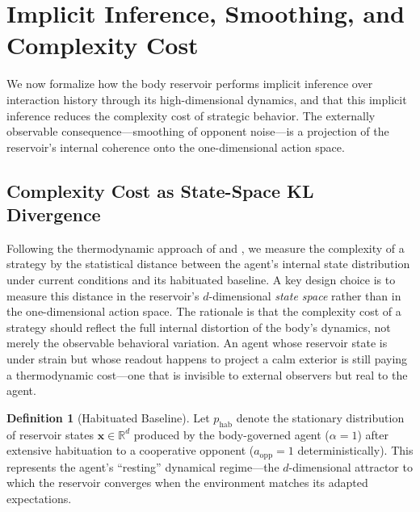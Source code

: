 \documentclass[11pt,a4paper]{article}
\theoremstyle{definition}
\newtheorem{definition}[theorem]{Definition}
\newcommand{\R}{\mathbb{R}}
\newcommand{\xstate}{\mathbf{x}}
\begin{document}
\section{Implicit Inference, Smoothing, and Complexity Cost}
\label{sec:smoothing}

We now formalize how the body reservoir performs implicit
inference over interaction history through its high-dimensional dynamics,
and that this implicit inference reduces the complexity cost of strategic behavior.
The externally observable consequence---smoothing of opponent noise---is a
projection of the reservoir's internal coherence onto the one-dimensional
action space.

\subsection{Complexity Cost as State-Space KL Divergence}

Following the thermodynamic approach of \citet{still2012} and
\citet{wolpert2019}, we measure the complexity of a strategy by the
statistical distance between the agent's internal state distribution under
current conditions and its habituated baseline.  A key design choice is to
measure this distance in the reservoir's $d$-dimensional \emph{state space}
rather than in the one-dimensional action space.  The rationale is that the
complexity cost of a strategy should reflect the full internal distortion
of the body's dynamics, not merely the observable behavioral variation.
An agent whose reservoir state is under strain but whose readout happens to
project a calm exterior is still paying a thermodynamic cost---one that is
invisible to external observers but real to the agent.

\begin{definition}[Habituated Baseline]
\label{def:habituated}
Let $p_{\mathrm{hab}}$ denote the stationary distribution of reservoir states
$\xstate \in \R^d$ produced by the body-governed agent ($\alpha = 1$) after
extensive habituation to a cooperative opponent
($a_{\mathrm{opp}} = 1$ deterministically).
This represents the agent's ``resting'' dynamical regime---the
$d$-dimensional attractor to which the reservoir converges when the
environment matches its adapted expectations.
\end{definition}
\end{document}
